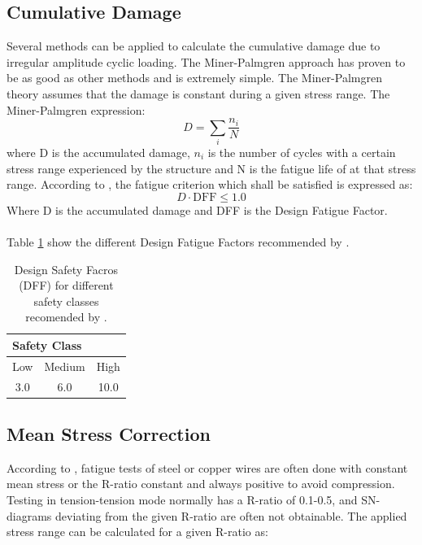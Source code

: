 \subsection{Cumulative Damage}
Several methods can be applied to calculate the cumulative damage due to irregular amplitude cyclic loading. The Miner-Palmgren approach has proven to be as good as other methods and is extremely simple. The Miner-Palmgren theory assumes that the damage is constant during a given stress range. The Miner-Palmgren expression:
\begin{equation}
    D=\sum_i \frac{n_i}{N} 
    \label{eq:MP}
\end{equation}
where D is the accumulated damage, $n_i$ is the number of cycles with a certain stress range experienced by the structure and N is the fatigue life of at that stress range.\newline
\newline
According to \cite{riserfat}, the fatigue criterion which shall be satisfied is expressed as:
\begin{equation}
    D \cdot \text{DFF} \leq 1.0
\end{equation}
Where D is the accumulated damage and DFF is the Design Fatigue Factor.\\\\ Table \ref{table:dff} show the different Design Fatigue Factors recommended by \cite{riserfat}. 

\begin{table} [H]
\centering
\begin{tabular}{ |c|c|c|}
\hline
\multicolumn{3}{|l|}{\hspace{0.8cm}Safety Class}\\
 \hline
 \hline
Low & Medium & High \\
3.0 & 6.0 & 10.0\\
 \hline
\end{tabular}
\caption{Design Safety Facros (DFF) for different safety classes  recomended by \cite{riserfat}.}
\label{table:dff}
\end{table}
\subsection{Mean Stress Correction}
\label{sec:meanstress}
According to \cite{Savik2016}, fatigue tests of steel or copper wires are often done with constant mean stress or the R-ratio constant and always positive to avoid compression. Testing in tension-tension mode normally has a R-ratio of 0.1-0.5, and SN-diagrams deviating from the given R-ratio are often not obtainable.  The applied stress range can be calculated for a given R-ratio as:


